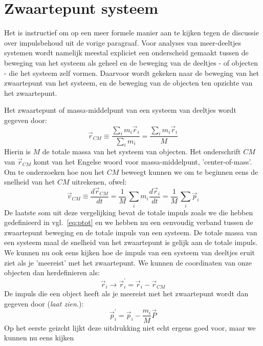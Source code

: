 \section{Zwaartepunt systeem}

Het is instructief om op een meer formele manier aan te kijken tegen de discussie over impulsbehoud
uit de vorige paragraaf. Voor analyses van meer-deeltjes systemen wordt namelijk meestal expliciet een
onderscheid gemaakt tussen de beweging van het systeem als geheel en de beweging van de deeltjes
- of objecten - die het systeem zelf vormen. Daarvoor wordt gekeken naar de beweging van het zwaartepunt
van het systeem, en de beweging van de objecten ten opzichte van het zwaartepunt.

Het zwaartepunt of massa-middelpunt van een systeem van deeltjes wordt gegeven door:
\begin{equation}
\vec{r}_{CM} \equiv \frac{\sum_i m_i \vec{r}_i}{\sum_i m_i} = \frac{\sum_i m_i \vec{r}_i}{M}
\end{equation}
Hierin is $M$ de totale massa van het systeem van objecten. Het onderschrift $CM$ van $\vec{r}_{CM}$ komt
van het Engelse woord voor massa-middelpunt, 'center-of-mass'. Om te onderzoeken hoe nou 
het $CM$ beweegt kunnen we om te beginnen eens de snelheid van het  $CM$ uitrekenen, ofwel:
\begin{equation}
\vec{v}_{CM} \equiv \frac{d\vec{r}_{CM}}{dt} = \frac{1}{M}\,\sum_i m_i \frac{d\vec{r}_i}{dt} = \frac{1}{M}\,\sum_i \vec{p}_i 
\end{equation} 
De laatste som uit deze vergelijking bevat de totale impuls zoals we die hebben gedefinieerd
in vgl.~\ref{eq:ptot} en we hebben nu een eenvoudig verband tussen de zwaartepunt beweging en 
de totale impuls van een systeem. De totale massa van een systeem maal de snelheid van het
zwaartepunt is gelijk aan de totale impuls. We kunnen nu ook eens kijken hoe de impuls van een systeem
van deeltjes eruit ziet als je 'meereist' met het zwaartepunt. We kunnen de coordinaten van onze
objecten dan herdefinieren als:
\begin{equation}
\vec{r}_i\rightarrow\vec{r}_i^{'} = \vec{r}_i-\vec{r}_{CM}
\end{equation}
De impuls die een object heeft als je meereist met het zwaartepunt wordt dan gegeven
door (\emph{laat zien.}):
\begin{equation}
\vec{p}_i^{'} = \vec{p}_i - \frac{m_i}{M}\vec{P}
\end{equation}
Op het eerste geizcht lijkt deze uitdrukking niet echt ergens goed voor, maar we kunnen nu eens kijken
